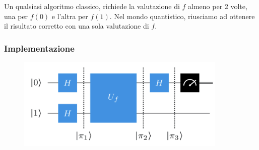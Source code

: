 Un qualsiasi algoritmo classico, richiede la valutazione di $f$ almeno per 2 volte, una per $f(0)$ e l'altra per 
$f(1)$. Nel mondo quantistico, riusciamo ad ottenere il risultato corretto con una sola valutazione di $f$.

\subsubsection{Implementazione}
\begin{figure}[h]
    \centering
    \includegraphics[width = 10cm]{./Images/deutch.png}
    \caption{}
    \label{fig15}
\end{figure}

